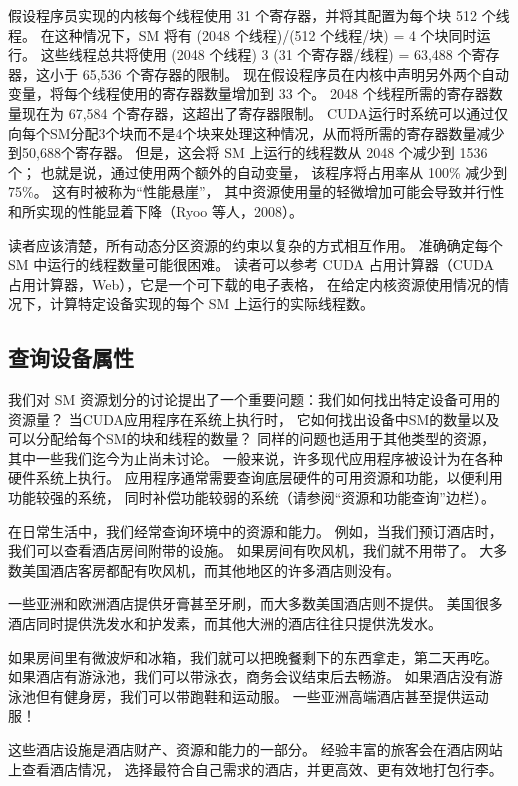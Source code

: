 假设程序员实现的内核每个线程使用 31 个寄存器，并将其配置为每个块 512 个线程。 
在这种情况下，SM 将有 (2048 个线程)/(512 个线程/块) = 4 个块同时运行。 
这些线程总共将使用 (2048 个线程) 3 (31 个寄存器/线程) = 63,488 个寄存器，这小于 65,536 个寄存器的限制。 
现在假设程序员在内核中声明另外两个自动变量，将每个线程使用的寄存器数量增加到 33 个。
2048 个线程所需的寄存器数量现在为 67,584 个寄存器，这超出了寄存器限制。
 CUDA运行时系统可以通过仅向每个SM分配3个块而不是4个块来处理这种情况，从而将所需的寄存器数量减少到50,688个寄存器。 
 但是，这会将 SM 上运行的线程数从 2048 个减少到 1536 个； 也就是说，通过使用两个额外的自动变量，
 该程序将占用率从 100\% 减少到 75\%。 这有时被称为“性能悬崖”，
 其中资源使用量的轻微增加可能会导致并行性和所实现的性能显着下降（Ryoo 等人，2008）。

读者应该清楚，所有动态分区资源的约束以复杂的方式相互作用。 准确确定每个 SM 中运行的线程数量可能很困难。 
读者可以参考 CUDA 占用计算器（CUDA 占用计算器，Web），它是一个可下载的电子表格，
在给定内核资源使用情况的情况下，计算特定设备实现的每个 SM 上运行的实际线程数。

\subsection{查询设备属性}
我们对 SM 资源划分的讨论提出了一个重要问题：我们如何找出特定设备可用的资源量？ 当CUDA应用程序在系统上执行时，
它如何找出设备中SM的数量以及可以分配给每个SM的块和线程的数量？ 同样的问题也适用于其他类型的资源，
其中一些我们迄今为止尚未讨论。 一般来说，许多现代应用程序被设计为在各种硬件系统上执行。 
应用程序通常需要查询底层硬件的可用资源和功能，以便利用功能较强的系统，
同时补偿功能较弱的系统（请参阅“资源和功能查询”边栏）。

\begin{remark}[资源和能力查询]
在日常生活中，我们经常查询环境中的资源和能力。 例如，当我们预订酒店时，我们可以查看酒店房间附带的设施。 
如果房间有吹风机，我们就不用带了。 大多数美国酒店客房都配有吹风机，而其他地区的许多酒店则没有。

一些亚洲和欧洲酒店提供牙膏甚至牙刷，而大多数美国酒店则不提供。 
美国很多酒店同时提供洗发水和护发素，而其他大洲的酒店往往只提供洗发水。

如果房间里有微波炉和冰箱，我们就可以把晚餐剩下的东西拿走，第二天再吃。 
如果酒店有游泳池，我们可以带泳衣，商务会议结束后去畅游。 如果酒店没有游泳池但有健身房，我们可以带跑鞋和运动服。 
一些亚洲高端酒店甚至提供运动服！

这些酒店设施是酒店财产、资源和能力的一部分。 经验丰富的旅客会在酒店网站上查看酒店情况，
选择最符合自己需求的酒店，并更高效、更有效地打包行李。
\end{remark}


